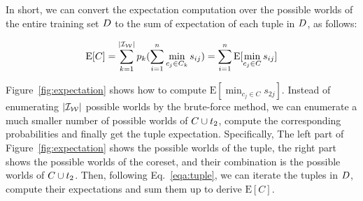 In short, we can convert the expectation computation over the possible worlds of the entire training set $D$ to the sum of expectation of each tuple in $D$, as follows:

\vspace{-0.5em}
\begin{equation}\label{eqa:tuple}
	\mathrm{E}[C] = \sum_{k= 1}^{|\mathcal{I_W}|} p_k (\sum_{i=1}^n \min_{c_j\in C_k}s_{ij})= \sum_{i=1}^n \mathrm{E}[\min_{c_j\in C}s_{ij}]
\end{equation}

\begin{example}
	Figure~\ref{fig:expectation} shows how to compute $\mathrm{E}[\min_{c_j\in C}s_{2j}]$. Instead of enumerating $|\mathcal{I_W}|$ possible worlds by the brute-force method, we can enumerate a much smaller number of possible worlds of $C \cup t_2$, compute the corresponding probabilities and finally get the tuple expectation. Specifically, The left part of Figure~\ref{fig:expectation} shows the possible worlds of the tuple,  the right part shows the possible worlds of the coreset, and their combination is the possible worlds of $C \cup t_2$. Then, following Eq.~\ref{eqa:tuple}, we can iterate the tuples in $D$, compute their expectations and sum them up to derive $\mathrm{E}[C]$.
\end{example}

